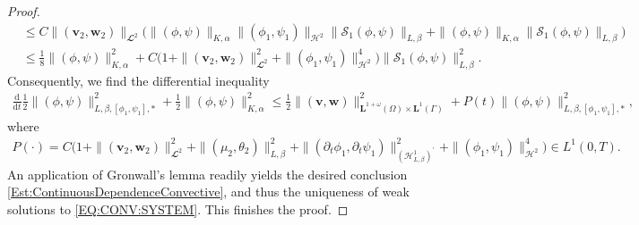 \documentclass[10pt,reqno]{amsart}
\theoremstyle{remark}
\numberwithin{equation}{section}
\newcommand{\norm}[1]{\| #1 \|}
\newcommand{\bv}{\mathbf{v}}
\newcommand{\bw}{\mathbf{w}}
\newcommand{\ddt}{\frac{\mathrm d}{\mathrm dt}}
\newcommand{\delt}{\partial_{t}}
\newcommand{\Om}{\Omega}
\newcommand{\Ga}{\Gamma}
\begin{document}
\begin{proof}
\begin{align*}
        &\leq C\norm{(\bv_2,\bw_2)}_{\mathbfcal{L}^2}\Big(\norm{(\phi,\psi)}_{K,\alpha}\norm{(\phi_1,\psi_1)}_{\mathcal{H}^2}\norm{\mathcal{S}_1(\phi,\psi)}_{L,\beta} + \norm{(\phi,\psi)}_{K,\alpha}\norm{\mathcal{S}_1(\phi,\psi)}_{L,\beta}\Big) \\
        &\leq \frac18\norm{(\phi,\psi)}_{K,\alpha}^2 + C\big(1 + \norm{(\bv_2,\bw_2)}_{\mathbfcal{L}^2}^2 + \norm{(\phi_1,\psi_1)}_{\mathcal{H}^2}^4\big)\norm{\mathcal{S}_1(\phi,\psi)}_{L,\beta}^2. 
    \end{align*}
    Consequently, we find the differential inequality
    \begin{align}\label{DiffIneq:Final}
        \ddt\frac12\norm{(\phi,\psi)}_{L,\beta,[\phi_1,\psi_1],\ast}^2 + \frac12\norm{(\phi,\psi)}_{K,\alpha}^2 \leq \frac12\norm{(\mathbf{v},\mathbf{w})}_{\mathbf{L}^{1+\omega}(\Om)\times\mathbf{L}^1(\Ga)}^2 + P(t)\norm{(\phi,\psi)}_{L,\beta,[\phi_1,\psi_1],\ast}^2,
    \end{align}
    where
    \begin{align*}
        P(\cdot) = C\big(1 + \norm{(\mathbf{v}_2,\mathbf{w}_2)}_{\mathbfcal{L}^2}^2 + \norm{(\mu_2,\theta_2)}_{L,\beta}^2 + \norm{(\delt\phi_1,\delt\psi_1)}_{(\mathcal{H}^1_{L,\beta})^\prime}^2 + \norm{(\phi_1,\psi_1)}_{\mathcal{H}^2}^4\big)\in L^1(0,T).
    \end{align*}
    An application of Gronwall's lemma readily yields the desired conclusion \eqref{Est:ContinuousDependenceConvective}, and thus the uniqueness of weak solutions to \eqref{EQ:CONV:SYSTEM}. This finishes the proof.
\end{proof}
\end{document}
